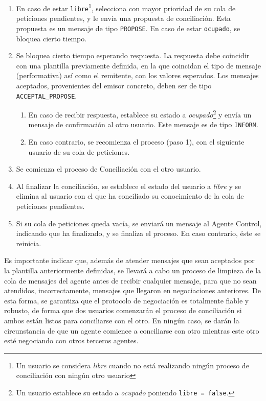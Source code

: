 \begin{enumerate}
	\item En caso de estar {\tt libre}\footnote{Un usuario se considera \emph{libre} cuando no está realizando ningún proceso de conciliación con ningún otro usuario}, selecciona con mayor prioridad de su cola de peticiones pendientes, y le envía una propuesta de conciliación. Esta propuesta es un mensaje de tipo {\tt PROPOSE}. En caso de estar {\tt ocupado}, se bloquea cierto tiempo.
	\item Se bloquea cierto tiempo esperando respuesta. La respuesta debe coincidir con una plantilla previamente definida, en la que coincidan el tipo de mensaje (performativa) así como el remitente, con los valores esperados. Los mensajes aceptados, provenientes del emisor concreto, deben ser de tipo {\tt ACCEPTAL\_PROPOSE}.
	\begin{enumerate}
		\item En caso de recibir respuesta, establece su estado a \emph{ocupado}\footnote{ Un usuario establece su estado a \emph{ocupado} poniendo {\tt libre = false}.} y envía un mensaje de confirmación al otro usuario. Este mensaje es de tipo {\tt INFORM}.
		\item En caso contrario, se recomienza el proceso (paso 1), con el siguiente usuario de su cola de peticiones.
	\end{enumerate}
	\item Se comienza el proceso de Conciliación con el otro usuario.
	\item Al finalizar la conciliación, se establece el estado del usuario a \emph{libre} y se elimina al usuario con el que ha conciliado su conocimiento de la cola de peticiones pendientes.
	\item Si su cola de peticiones queda vacía, se enviará un mensaje al Agente Control, indicando que ha finalizado, y se finaliza el proceso. En caso contrario, éste se reinicia.
\end{enumerate}

Es importante indicar que, además de atender mensajes que sean aceptados por la plantilla anteriormente definidas, se llevará a cabo un proceso de limpieza de la cola de mensajes del agente antes de recibir cualquier mensaje, para que no sean atendidos, incorrectamente, mensajes que llegaron en negociaciones anteriores. De esta forma, se garantiza que el protocolo de negociación es totalmente fiable y robusto, de forma que dos usuarios comenzarán el proceso de conciliación si ambos están listos para conciliarse con el otro. En ningún caso, se darán la circunstancia de que un agente comience a conciliarse con otro mientras este otro esté negociando con otros terceros agentes.

